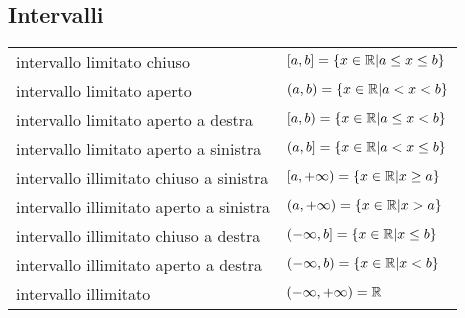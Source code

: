 \subsection{Intervalli}
\begin{tabular}{ll}
intervallo limitato chiuso &$[a,b] = \left\{ x\in \mathbb{R} \middle| a \leq x \leq b \right\}$ \\
intervallo limitato aperto&$(a,b) = \left\{ x\in \mathbb{R} \middle| a < x < b \right\}$ \\
intervallo limitato aperto a destra&$[a,b) = \left\{ x\in \mathbb{R} \middle| a \leq x < b \right\}$ \\
intervallo limitato aperto a sinistra&$(a,b] = \left\{ x\in \mathbb{R} \middle| a < x \leq b \right\}$ \\

intervallo illimitato chiuso a sinistra&$[a,+\infty) = \left\{ x\in \mathbb{R} \middle| x \geq a \right\}$ \\
intervallo illimitato aperto a sinistra&$(a,+\infty) = \left\{ x\in \mathbb{R} \middle| x > a \right\}$ \\
intervallo illimitato chiuso a destra&$(-\infty,b] = \left\{ x\in \mathbb{R} \middle| x \leq b \right\}$ \\
intervallo illimitato aperto a destra&$(-\infty,b) = \left\{ x\in \mathbb{R} \middle| x < b \right\}$ \\
intervallo illimitato&$(-\infty,+\infty) = \mathbb{R}$ \\

\end{tabular}


